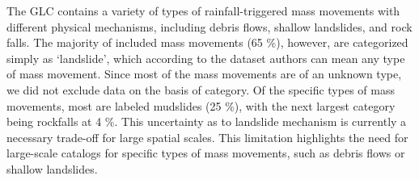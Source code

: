 \documentclass[nhess, manuscript]{copernicus}
\begin{document}
The GLC contains a variety of types of rainfall-triggered mass movements with different physical mechanisms, including debris flows, shallow landslides, and rock falls. The majority of included mass movements (65 \%), however, are categorized simply as ‘landslide’, which according to the dataset authors can mean any type of mass movement. Since most of the mass movements are of an unknown type, we did not exclude data on the basis of category. Of the specific types of mass movements, most are labeled mudslides (25 \%), with the next largest category being rockfalls at 4 \%. This uncertainty as to landslide mechanism is currently a necessary trade-off for large spatial scales. This limitation highlights the need for large-scale catalogs for specific types of mass movements, such as debris flows or shallow landslides.
\end{document}
